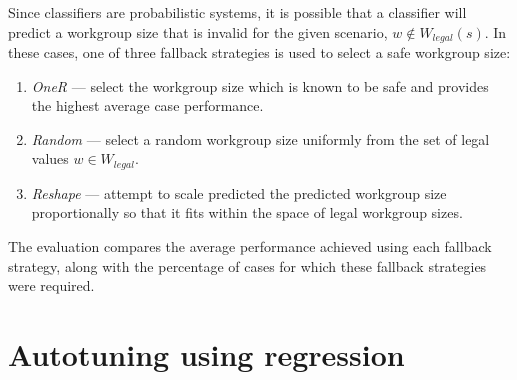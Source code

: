 Since classifiers are probabilistic systems, it is possible that a
classifier will predict a workgroup size that is invalid for the given
scenario, $w \not\in W_{legal}(s)$. In these cases, one of three
fallback strategies is used to select a safe workgroup size:

\begin{enumerate}
\item \emph{OneR} --- select the workgroup size which is known to be
  safe and provides the highest average case performance.
\item \emph{Random} --- select a random workgroup size uniformly from
  the set of legal values $w \in W_{legal}$.
\item \emph{Reshape} --- attempt to scale predicted the predicted
  workgroup size proportionally so that it fits within the space of
  legal workgroup sizes.
\end{enumerate}

The evaluation compares the average performance achieved using each
fallback strategy, along with the percentage of cases for which these
fallback strategies were required.

\section{Autotuning using regression}
